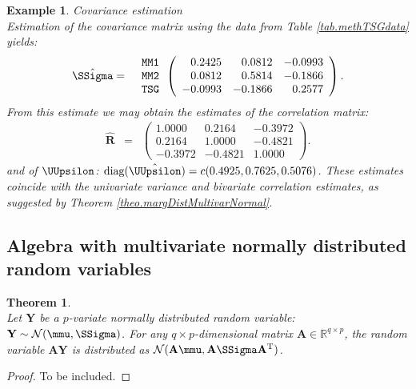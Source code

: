 \documentclass[a4paper]{article}
\theoremstyle{myexamplestyle}
\newtheorem{example}{Example}
\newtheorem{ther}{Theorem}
\begin{document}
\begin{example} \textit{Covariance estimation}
\\
Estimation of the covariance matrix using the data from Table \ref{tab.methTSGdata} yields:
\begin{eqnarray*}
\hat{\SSigma} & = &
\begin{array}{r}
\texttt{MM1} 
\\
\texttt{MM2}
\\
\texttt{TSG}
\end{array}
\left(
\begin{array}{rrr}
0.2425 &  0.0812 & -0.0993
\\
0.0812 & 0.5814 & -0.1866
\\
-0.0993 & -0.1866  &   0.2577
\end{array}
\right).
\end{eqnarray*}
From this estimate we may obtain the estimates of the correlation matrix:
\begin{eqnarray*}
\hat{\mathbf{R}} & = & 
\left(
\begin{array}{rrr}
1.0000 & 0.2164  & -0.3972
\\
0.2164 & 1.0000 & -0.4821
\\
-0.3972 & -0.4821 & 1.0000
\end{array}
\right).
\end{eqnarray*}
and of $\UUpsilon$:  $\mbox{diag}( \hat{\UUpsilon} ) = c(0.4925, 0.7625, 0.5076)$. These estimates coincide with the univariate variance and bivariate correlation estimates, as suggested by Theorem \ref{theo.margDistMultivarNormal}.
\end{example}

\subsection{Algebra with multivariate normally distributed random variables}
\begin{ther} \mbox{ }
\\
Let $\mathbf{Y}$ be a $p$-variate normally distributed random variable: $\mathbf{Y} \sim \mathcal{N}(\mmu, \SSigma)$. For any $q \times p$-dimensional matrix $\mathbf{A} \in \mathbb{R}^{q \times p}$, the random variable $\mathbf{A} \mathbf{Y}$ is distributed as $ \mathcal{N}(\mathbf{A} \mmu, \mathbf{A} \SSigma \mathbf{A}^{\mathrm{T}})$. 
\end{ther}
\begin{proof} 
To be included. 
\end{proof}
\end{document}
